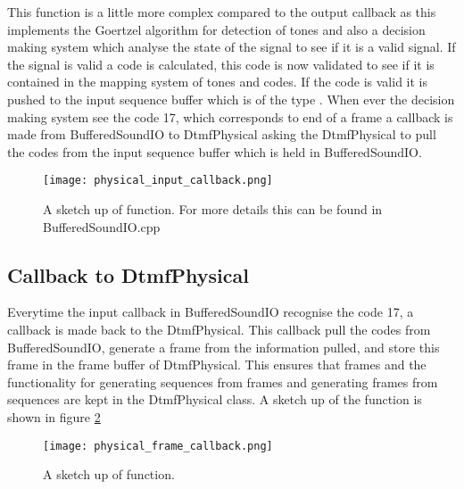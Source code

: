 		This function is a little more complex compared to the output callback as this implements the Goertzel algorithm for detection of tones and also
		a decision making system which analyse the state of the signal to see if it is a valid signal. If the signal is valid a code is calculated, this
		code is now validated to see if it is contained in the mapping system of tones and codes. If the code is valid it is pushed to the input
		sequence buffer which is of the type . When ever the decision making system see the code 17,
		which corresponds to end of a frame a callback is made from BufferedSoundIO to DtmfPhysical asking the DtmfPhysical to pull the codes from
		the input sequence buffer which is held in BufferedSoundIO.
		
		\begin{figure}[htb]
			\begin{center}
			\texttt{[image: physical\_input\_callback.png]}%
			\caption{A sketch up of  function. For more details this can be found in BufferedSoundIO.cpp}
			\label{fig:physical_input_callback}
			\end{center}
		\end{figure}
		
	\subsection{Callback to DtmfPhysical}
	Everytime the input callback in BufferedSoundIO recognise the code 17, a callback is made back to the DtmfPhysical. This callback pull the
	codes from BufferedSoundIO, generate a frame from the information pulled, and store this frame in the frame buffer of DtmfPhysical. This ensures
	that frames and the functionality for generating sequences from frames and generating frames from sequences are kept in the DtmfPhysical class.
	A sketch up of the function is shown in figure \ref{fig:physical_frame_callback}
	
	\begin{figure}[htb]
		\begin{center}
		\texttt{[image: physical\_frame\_callback.png]}%
		\caption{A sketch up of  function.}
		\label{fig:physical_frame_callback}
		\end{center}
	\end{figure}
